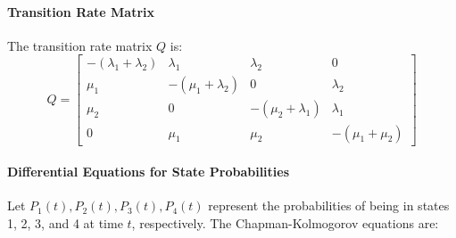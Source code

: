 \documentclass[a4paper,12pt]{article}
\begin{document}
\begin{answerbox}
		\paragraph{Transition Rate Matrix}
		The transition rate matrix \( Q \) is:
		\[
		Q =
		\begin{bmatrix}
			-(\lambda_1 + \lambda_2) & \lambda_1 & \lambda_2 & 0 \\
			\mu_1 & -(\mu_1 + \lambda_2) & 0 & \lambda_2 \\
			\mu_2 & 0 & -(\mu_2 + \lambda_1) & \lambda_1 \\
			0 & \mu_1 & \mu_2 & -(\mu_1 + \mu_2)
		\end{bmatrix}
		\]
		
		\paragraph{Differential Equations for State Probabilities}
		Let \( P_1(t), P_2(t), P_3(t), P_4(t) \) represent the probabilities of being in states 1, 2, 3, and 4 at time \( t \), respectively. The Chapman-Kolmogorov equations are:

	\end{answerbox}
	
\end{document}
